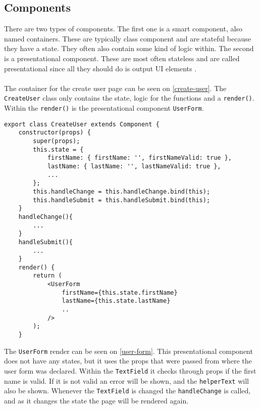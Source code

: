 \subsection{Components}
There are two types of components. 
The first one is a smart component, also named containers.
These are typically class component and are stateful because they have a state.
They often also contain some kind of logic within.
The second is a presentational component.
These are most often stateless and are called presentational since all they should do is output UI elements \cite{Vumbula-react}.
\\\\
The container for the create user page can be seen on \autoref{create-user}.
The \texttt{CreateUser} class only contains the state, logic for the functions and a \texttt{render()}.
Within the \texttt{render()} is the presentational component \texttt{UserForm}. 
\begin{lstlisting}[caption={Component to create user}, captionpos=b, label={create-user}]
export class CreateUser extends Component {
    constructor(props) {
        super(props);
        this.state = {
            firstName: { firstName: '', firstNameValid: true },
            lastName: { lastName: '', lastNameValid: true },
            ...
        };
        this.handleChange = this.handleChange.bind(this);
        this.handleSubmit = this.handleSubmit.bind(this);
    }
    handleChange(){
        ...
    }
    handleSubmit(){
        ...
    }
    render() {
        return (
            <UserForm
                firstName={this.state.firstName}
                lastName={this.state.lastName}
                ..
            />
        );
    }
\end{lstlisting}

The \texttt{UserForm} render can be seen on \autoref{user-form}.
This presentational component does not have any states, but it uses the props that were passed from where the user form was declared.
Within the \texttt{TextField} it checks through props if the first name is valid. 
If it is not valid an error will be shown, and the \texttt{helperText} will also be shown.
Whenever the \texttt{TextField} is changed the \texttt{handleChange} is called, and as it changes the state the page will be rendered again.

